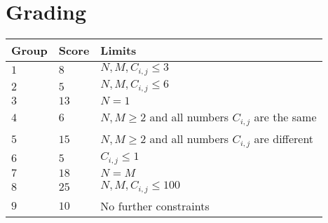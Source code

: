 \section*{Grading}
\begin{tabular}{| l | l | p{12cm} |}
    \hline
    Group & Score & Limits \\ \hline
    $1$   & $8$       & $N,M,C_{i,j} \leq 3$\\ \hline
    $2$   & $5$       & $N,M,C_{i,j} \leq 6$  \\ \hline
    $3$   & $13$       & $N = 1$ \\ \hline
    $4$   & $6$       & $N,M \geq 2$ and all numbers $C_{i,j}$ are the same \\ \hline
    $5$   & $15$       & $N,M \geq 2$ and all numbers $C_{i,j}$ are different \\ \hline
    $6$   & $5$       & $C_{i,j} \leq 1$ \\ \hline
    $7$   & $18$       & $N = M$ \\ \hline
    $8$   & $25$       & $N,M,C_{i,j} \leq 100$ \\ \hline
    $9$   & $10$       & No further constraints \\ \hline
  \end{tabular}
